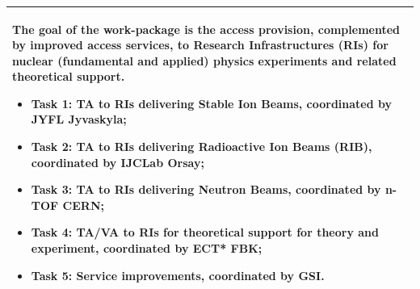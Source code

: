 \begin{table}[H]
{\begin{tabular}{|p{}|}
        \hline
        \rowcolor{white} 
        \hspace*{-0.75cm} 
        \begin{minipage}[t]{\textwidth}
        {\leftskip=15pt
        The goal of the work-package is the access provision, complemented by improved access services, to Research Infrastructures (RIs) for nuclear (fundamental and applied) physics experiments and related theoretical support.
    		\begin{itemize}
    		    \item Task 1: TA to RIs delivering Stable Ion Beams, coordinated by JYFL Jyvaskyla;
    			\item Task 2: TA to RIs delivering Radioactive Ion Beams (RIB), coordinated by IJCLab Orsay;
			    \item Task 3: TA to RIs delivering Neutron Beams, coordinated by n-TOF CERN;
                    \item Task 4: TA/VA to RIs for theoretical support for theory and experiment, coordinated by ECT* FBK; 
                    \item Task 5: Service improvements, coordinated by GSI.
    		\end{itemize} 
    		\vspace*{0.10em}
            }
		\end{minipage}        
        \\
        \hline
    \end{tabular}}
   \vspace{0.5em}\vfill
   


\end{table}
